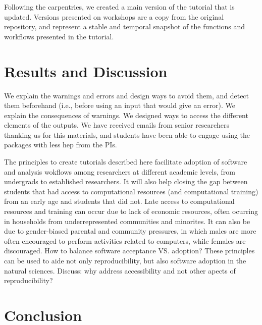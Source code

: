 \documentclass[12pt]{article}
\begin{document}
Following the carpentries, we created a main version of the tutorial that
is updated. Versions presented on workshops are a copy from the original repository,
and represent a stable and temporal snapshot of the functions and workflows presented
in the tutorial.


\section{Results and Discussion}
\label{sec:results}

We explain the warnings and errors and design ways to avoid them, and detect them beforehand (i.e., before using an input that would give an error). We explain the consequences of warnings.
We designed ways to access the different elements of the outputs.
We have received emails from senior researchers thanking us for this materials, and students have been able to engage using the packages with less hep from the PIs.

The principles to create tutorials described here facilitate adoption of software and analysis wokflows among researchers at different academic levels, from undergrads to established researchers.
It will also help closing the gap between students that had access to computational resources (and computational training) from an early age and students that did not. Late access to computational resources and training can occur due to lack of economic resources, often ocurring in households from underrepresented communities and minorites. It can also be due to gender-biased parental and community pressures, in which males are more often encouraged to perform activities related to computers, while females are discouraged.
How to balance software acceptance VS. adoption?
These principles can be used to aide not only reproducibility, but also software adoption in the natural sciences.
Discuss: why address accessibility and not other apects of reproducibility?


\section{Conclusion}
\label{sec:conc}
\end{document}
